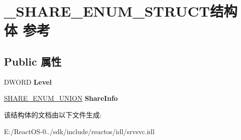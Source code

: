 \hypertarget{struct___s_h_a_r_e___e_n_u_m___s_t_r_u_c_t}{}\section{\+\_\+\+S\+H\+A\+R\+E\+\_\+\+E\+N\+U\+M\+\_\+\+S\+T\+R\+U\+C\+T结构体 参考}
\label{struct___s_h_a_r_e___e_n_u_m___s_t_r_u_c_t}
\subsection*{Public 属性}
\begin{DoxyCompactItemize}
\item 
\mbox{\label{struct___s_h_a_r_e___e_n_u_m___s_t_r_u_c_t_abaaab4a391dd787d5d0957a33e2cd3a6}} 
D\+W\+O\+RD {\bfseries Level}
\item 
\mbox{\label{struct___s_h_a_r_e___e_n_u_m___s_t_r_u_c_t_a6b0f4af9d79000c420cb3457e04b0f8a}} 
\hyperlink{union___s_h_a_r_e___e_n_u_m___u_n_i_o_n}{S\+H\+A\+R\+E\+\_\+\+E\+N\+U\+M\+\_\+\+U\+N\+I\+ON} {\bfseries Share\+Info}
\end{DoxyCompactItemize}


该结构体的文档由以下文件生成\+:\begin{DoxyCompactItemize}
\item 
E\+:/\+React\+O\+S-\/0../sdk/include/reactos/idl/srvsvc.\+idl\end{DoxyCompactItemize}
